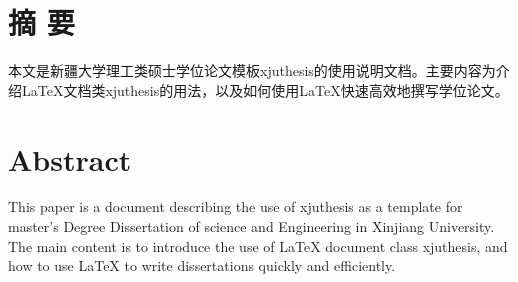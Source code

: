 \author{刘庆飞}%
\maketitle%
\chapter{摘 \quad 要}
\setcounter{page}{1}%

本文是新疆大学理工类硕士学位论文模板xjuthesis的使用说明文档。主要内容为介绍\LaTeX{}文档类xjuthesis的用法，以及如何使用\LaTeX{}快速高效地撰写学位论文。

\chapter{Abstract}%

This paper is a document describing the use of xjuthesis as a template for master's Degree Dissertation of science and Engineering in Xinjiang University. The main content is to introduce the use of \LaTeX{} document class xjuthesis, and how to use \LaTeX{} to write dissertations quickly and efficiently.

